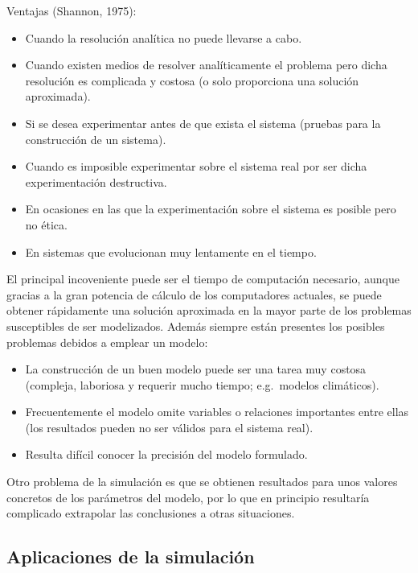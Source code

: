 \documentclass[
]{book}
\theoremstyle{break}
\theoremstyle{nonumberplain}
\begin{document}
Ventajas (Shannon, 1975):

\begin{itemize}
\item
  Cuando la resolución analítica no puede llevarse a cabo.
\item
  Cuando existen medios de resolver analíticamente el problema
  pero dicha resolución es complicada y costosa
  (o solo proporciona una solución aproximada).
\item
  Si se desea experimentar antes de que exista el sistema
  (pruebas para la construcción de un sistema).
\item
  Cuando es imposible experimentar sobre el sistema real
  por ser dicha experimentación destructiva.
\item
  En ocasiones en las que la experimentación sobre el sistema es
  posible pero no ética.
\item
  En sistemas que evolucionan muy lentamente en el tiempo.
\end{itemize}

El principal incoveniente puede ser el tiempo de computación necesario, aunque gracias a la gran potencia de cálculo de los computadores actuales, se puede obtener rápidamente una solución aproximada en la mayor parte de los problemas susceptibles de ser modelizados.
Además siempre están presentes los posibles problemas debidos a emplear un modelo:

\begin{itemize}
\item
  La construcción de un buen modelo puede ser una tarea muy costosa
  (compleja, laboriosa y requerir mucho tiempo;
  e.g.~modelos climáticos).
\item
  Frecuentemente el modelo omite variables o relaciones importantes entre ellas
  (los resultados pueden no ser válidos para el sistema real).
\item
  Resulta difícil conocer la precisión del modelo formulado.
\end{itemize}

Otro problema de la simulación es que se obtienen resultados para unos valores concretos de los parámetros del modelo, por lo que en principio
resultaría complicado extrapolar las conclusiones a otras situaciones.

\hypertarget{aplicaciones-de-la-simulaciuxf3n}{%
\subsection{Aplicaciones de la simulación}\label{aplicaciones-de-la-simulaciuxf3n}}
\end{document}
